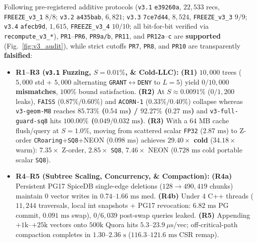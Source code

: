\documentclass[conference]{IEEEtran}
\begin{document}
Following pre-registered additive protocols (\texttt{v3.1} \texttt{e39260a}, $22{,}533$ recs, \texttt{FREEZE\_v3\_1} $8/8$; \texttt{v3.2} \texttt{a435bab}, $6{,}821$; \texttt{v3.3} \texttt{7ce7d44}, $8{,}524$, \texttt{FREEZE\_v3\_3} $9/9$; \texttt{v3.4} \texttt{afecb9d}, $1{,}615$, \texttt{FREEZE\_v3\_4} $10/10$; all bit-for-bit verified via \texttt{recompute\_v3\_*}), \texttt{PR1}--\texttt{PR6}, \texttt{PR9a/b}, \texttt{PR11}, and \texttt{PR12a}--\texttt{c} are \textbf{supported} (Fig.~\ref{fig:v3_audit}), while strict cutoffs \texttt{PR7}, \texttt{PR8}, and \texttt{PR10} are transparently \textbf{falsified}:
\begin{itemize}\setlength{\itemsep}{1pt}\setlength{\parskip}{0pt}
    \item \textbf{R1--R3 (\texttt{v3.1} Fuzzing, $S{=}0.01\%$, \& Cold-LLC):} \textbf{(R1)} $10{,}000$ trees ($5{,}000$ std + $5{,}000$ alternating \texttt{GRANT}$\leftrightarrow$\texttt{DENY} to $L{=}5$) yield \textbf{$0/10{,}000$ mismatches}, $100\%$ bound satisfaction. \textbf{(R2)} At $S{\approx}0.0091\%$ ($0/1{,}200$ leaks), \texttt{FAISS} ($0.87\%/0.60\%$) and \texttt{ACORN-1} ($0.33\%/0.40\%$) collapse whereas \texttt{v3-geom-M8} reaches \textbf{$85.73\%$ ($0.54\text{ ms}$) / $92.27\%$ ($0.27\text{ ms}$)} and \texttt{v3-full-guard-sq8} hits \textbf{$100.00\%$ ($0.049/0.032\text{ ms}$)}. \textbf{(R3)} With a $64\text{ MB}$ cache flush/query at $S{=}1.0\%$, moving from scattered scalar \texttt{FP32} ($2.87\text{ ms}$) to Z-order \texttt{CRoaring}+\texttt{SQ8}+NEON ($0.098\text{ ms}$) achieves \textbf{$29.40\times$ cold} ($34.18\times$ warm): $7.35\times$ Z-order, $2.85\times$ \texttt{SQ8}, $7.46\times$ NEON ($0.728\text{ ms}$ cold portable scalar \texttt{SQ8}).
    \item \textbf{R4--R5 (Subtree Scaling, Concurrency, \& Compaction):} \textbf{(R4a)} Persistent PG17 SpiceDB single-edge deletions ($128\to 490{,}419$ chunks) maintain $0$ vector writes in $0.74$--$1.66\text{ ms}$ med. \textbf{(R4b)} Under $4$ C++ threads ($11{,}244$ traversals, local int snapshots + PG17 revocation: $6.82\text{ ms}$ PG commit, $0.091\text{ ms}$ swap), \textbf{$0/6{,}039$} post-swap queries leaked. \textbf{(R5)} Appending $+1\text{k}$--$+25\text{k}$ vectors onto $500\text{k}$ Quora hits $5.3$--$23.9~\mu\text{s}$/vec; off-critical-path compaction completes in $1.30$--$2.36\text{ s}$ ($116.3$--$121.6\text{ ms}$ CSR remap).

\end{itemize}
\end{document}
